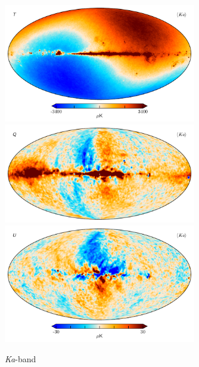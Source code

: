 \documentclass[twocolumn]{../../common/aa}
\newcommand{\Ka}[0]{\textit{Ka}}
\begin{document}
\begin{figure}
	\centering
	\includegraphics[width=0.75\textwidth]{figures/030-WMAP_Ka_mu_I.pdf}
	\includegraphics[width=0.75\textwidth]{figures/030-WMAP_Ka_mu_Q.pdf}
	\includegraphics[width=0.75\textwidth]{figures/030-WMAP_Ka_mu_U.pdf}
	\caption{\Ka-band}
	\label{fig:kaband}
\end{figure}
\end{document}

